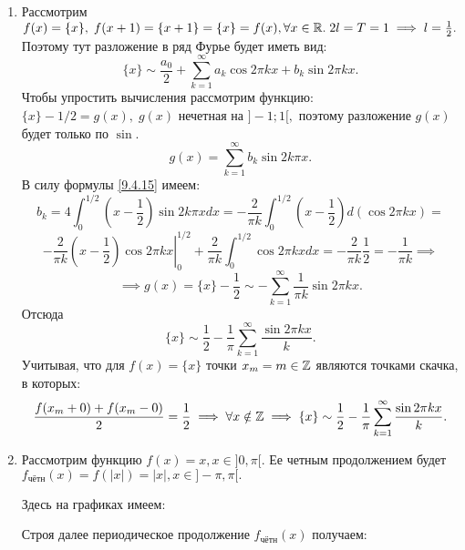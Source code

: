\documentclass[../../main.tex]{subfiles}
\begin{document}
		\begin{examples}
			\begin{enumerate}
				\item Рассмотрим $f(x) = \{x\}, \; f(x + 1) = \{x+1\} = \{x\} = f(x), 
				\forall x \in \mathbb{R}. \; 2l = T = 1 \implies l = \frac{1}{2}.$
				Поэтому тут разложение в ряд Фурье будет иметь вид:
				\[
					\{x\} \sim \frac{a_0}{2} + \sum_{k=1}^{\infty}  a_k \cos 
					2 \pi k x +
					b_k \sin 2 \pi k x.
				\]
				Чтобы упростить вычисления рассмотрим функцию: $\{x\} - 1/2 = g(x), \; 
				g(x) $ нечетная на $]-1; 1[,$ поэтому разложение $g(x)$ будет только по 
				$\sin.$
				\[
					g(x) = \sum_{k=1}^{\infty} b_k \sin 2 k \pi x.
				\] 
				В силу формулы \ref{9.4.15} имеем:
				\[
					b_k = 4 \int_{0}^{1/2} \left(x - \frac{1}{2}\right) \sin 2 k \pi x dx =
					-\frac{2}{\pi k} \int_{0}^{1/2} \left(x - \frac{1}{2}\right)  d (\cos 2 
					\pi k x) = 
					\]
					\[
					-\frac{2}{\pi k} \left. \left(x - \frac{1}{2}\right) \cos 2 \pi k x 
					\right|_0^{1/2} + \frac{2}{\pi k}  \int_{0}^{1/2} \cos 2 \pi k x dx =
					-\frac{2}{\pi k} \frac{1}{2} = -\frac{1}{\pi k} \implies
				\]
				\[
				\implies
				g(x) = \{x\} - \frac{1}{2} \sim - \sum_{k=1}^{\infty} \frac{1}{\pi k} \sin 
				2 \pi k x.
				\]
				Отсюда 
				\[
					\{x\} \sim \frac{1}{2}  -\frac{1}{\pi} \sum_{k=1}^{\infty} \frac{\sin 2 
					\pi k x}{k}.
				\]
				Учитывая, что для $f(x) = \{x\}$ точки $x_m = m \in \mathbb{Z}$ являются точками 
				скачка, в которых:
				\[
					\frac{f(x_m+0) + f(x_m-0)}{2} = \frac{1}{2} \implies 
					\forall x \notin \mathbb{Z} \implies \{x\} \sim \frac{1}{2}  -\frac{1}{\pi} 
					\sum_{k=1}^{\infty} \frac{\sin 2 \pi k x}{k}.
				\]
				\item Рассмотрим функцию $f(x) = x, x \in ]0, \pi[.$ 
				Ее четным продолжением будет $f_{\text{чётн}}(x) = f(|x|) = |x|, x \in 
				]-\pi, \pi[.$
				
				Здесь на графиках имеем:
				
				Строя далее периодическое продолжение $f_{\text{чётн}}(x)$ получаем:
				

\end{enumerate}
\end{examples}
\end{document}

